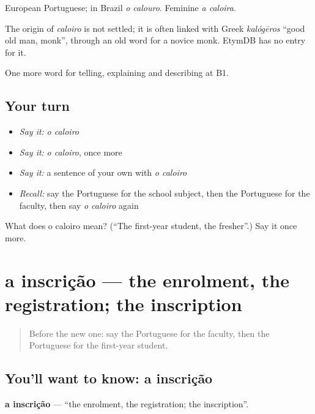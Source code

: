 European Portuguese; in Brazil \emph{o calouro}. Feminine \emph{a caloira}.

\begin{cousinweb}
The origin of \emph{caloiro} is not settled; it is often linked with Greek \emph{kalógēros} \textquotedblleft{}good old man, monk\textquotedblright{}, through an old word for a novice monk. EtymDB has no entry for it.
\end{cousinweb}

\begin{grammarlens}[title={What you've built}]
One more word for telling, explaining and describing at B1.
\end{grammarlens}

\subsection*{Your turn}
\begin{itemize}
\raggedright
  \item \emph{Say it:} \emph{o caloiro}
  \item \emph{Say it:} \emph{o caloiro}, once more
  \item \emph{Say it:} a sentence of your own with \emph{o caloiro}
  \item \emph{Recall:} say the Portuguese for the school subject, then the Portuguese for the faculty, then say \emph{o caloiro} again
\end{itemize}

\begin{tcolorbox}[breakable,colback=teal!4,colframe=teal!35!black,title={Before you move on}]
What does o caloiro mean? (\textquotedblleft{}The first-year student, the fresher\textquotedblright{}.) Say it once more.
\end{tcolorbox}
\section[a inscrição]{a inscrição — the enrolment, the registration; the inscription}

\label{lesson:PT-C376-inscricao}



\begin{quote}
Before the new one: say the Portuguese for the faculty, then the Portuguese for the first-year student.
\end{quote}

\subsection*{You'll want to know: a inscrição}
\textbf{a inscrição} — \textquotedblleft{}the enrolment, the registration; the inscription\textquotedblright{}.

